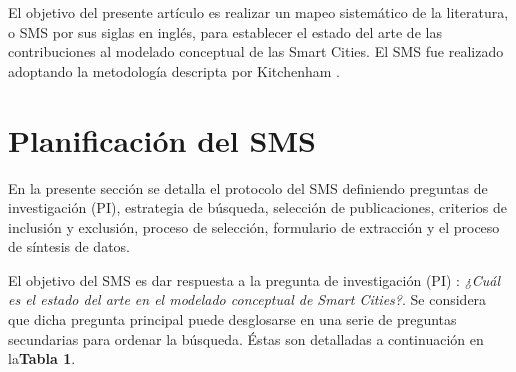 \documentclass[runningheads,a4paper,spanish]{llncs}
\begin{document}



El objetivo del presente artículo es realizar un mapeo sistemático de la
literatura, o SMS por sus siglas en inglés, para establecer el estado del arte
de las contribuciones al modelado conceptual de las Smart Cities. El SMS fue realizado adoptando la metodología descripta por Kitchenham \cite{kitchenham_guidelines_2007}.



%

\section{Planificación del SMS}\label{metodo}

En la presente sección se detalla el protocolo del SMS definiendo preguntas de
investigación (PI), estrategia de búsqueda, selección de publicaciones,
criterios de inclusión y exclusión, proceso de selección, formulario de
extracción y el proceso de síntesis de datos.

El objetivo del SMS es dar respuesta a la pregunta de investigación (PI) :
\textit{¿Cuál es el estado del arte en el modelado conceptual de Smart
Cities?}. Se considera que dicha pregunta principal puede desglosarse en una
serie de preguntas secundarias para ordenar la búsqueda. Éstas son detalladas a
continuación en la\textbf{Tabla 1}.
\end{document}
